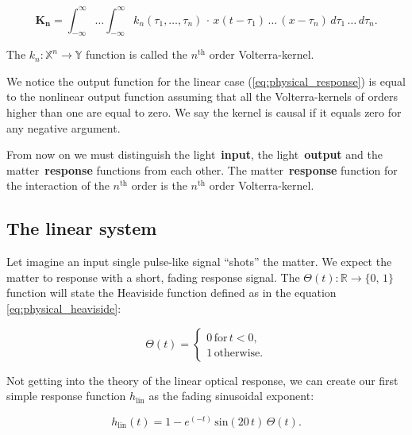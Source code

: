 \documentclass[12pt,twoside,a4paper]{article}
\numberwithin{equation}{subsection}
\numberwithin{figure}{subsection}
\begin{document}
\begin{equation} \label{eq:physical_volterraoperator}
  \mathbf{K_n} = \int_{ - \infty}^{\infty} \ldots \int_{ - \infty}^{\infty} k_n (\tau_1, \ldots, \tau_n) \, \cdot \, x(t - \tau_1) \, \ldots
  \, (x - \tau_n)\, d\tau_1 \, \ldots \, d\tau_n .
\end{equation}

The $ k_n : \mathbb{X}^{n} \rightarrow \mathbb{Y} $ function is called the $ n ^ {\text{th}} $ order Volterra-kernel. 

We notice the output function for the linear case (\ref{eq:physical_response}) is equal to the nonlinear output function assuming that all
the Volterra-kernels of orders higher than one are equal to zero. We say the kernel is causal if it equals zero for any negative
argument.

From now on we must distinguish the light~\textbf{input}, the light~\textbf{output} and the matter~\textbf{response} functions from each
other. The matter~\textbf{response} function for the interaction of the $ n^{\text{th}} $ order is the $ n^{\text{th}} $ order
Volterra-kernel.

\subsection{The linear system} \label{chap:physical_linearsystem}

Let imagine an input single pulse-like signal ``shots'' the matter. We expect the matter to response with a short, fading response signal.
The $ \Theta (t) : \mathbb{R} \rightarrow \{0, \, 1 \} $ function will state the Heaviside function defined as in the equation
\ref{eq:physical_heaviside}:

\begin{equation} \label{eq:physical_heaviside}
   \Theta(t)  =  
   \begin{cases}
     0 \, \text{for} \, t < 0, \\
     1 \, \text{otherwise}.
   \end{cases}
\end{equation}

Not getting into the theory of the linear optical response, we can create our first simple response function $ h_{\text{lin}} $ as the
fading sinusoidal exponent:

\begin{equation} \label{eq:physical_linear_response}
  h_{\text{lin}} (t) = 1 - e^{( - t)}\,\mathrm{sin}(20\,t)\,\Theta (t) .
\end{equation}
\end{document}
